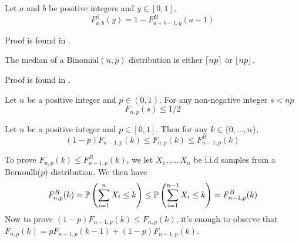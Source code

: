 \begin{lemma} \label{fact:equation_for_beta_binomial_cdfs}
	Let $a$ and $b$ be positive integers and $y \in [0,1]$, 
	\[
	F^\beta_{a,b}(y) = 1 - F^B_{a+b-1,y}(a-1)
	\]
\end{lemma}
\begin{myproof}[Proof.]
	Proof is found in \cite{agrawalanalysis}.
\end{myproof}
\begin{lemma} \label{fact:median_of_binomial_dist}
	The median of a Binomial$(n,p)$ distribution is either $\ceil{np}$ or $\floor{np}$.
\end{lemma}
\begin{myproof}[Proof]
	Proof is found in \cite{jogdeo1968monotone}.
\end{myproof}

\begin{corollary} \label{cor:corollarly_of_binomial_median_property}
	Let $n$ be a positive integer and $p \in (0,1)$. For any non-negative integer $s < np$
	\[
	F_{n,p}(s) \le 1/2
	\]
\end{corollary}

\begin{lemma} \label{fact:relationship_with_binom_cdfs}
	Let $n$ be a positive integer and $p \in [0,1]$. Then for any $k \in \{0,\ldots,n\}$,
	\[
	(1-p)F_{n-1,p}(k)\le F_{n,p}(k) \le F^B_{n-1,p}(k)
	\] 
\end{lemma}
\begin{myproof}[Proof]
	To prove $F_{n,p}(k) \le F^B_{n-1,p}(k)$, we let $X_1,\ldots,X_{n}$ be i.i.d samples from a Bernoulli($p$) distribution. We then have
	\begin{align*}
	F^B_{n,p}(k)  = \P{\sum_{i=1}^{n} X_i \le k}  \le  \P{\sum_{i=1}^{n-1} X_i \le k}  = F^B_{n-1,p}(k)
	\end{align*}
	Now to prove $(1-p)F_{n-1,p}(k)\le F_{n,p}(k)$, it's enough to observe that $F_{n,p}(k) = p F_{n-1,p}(k-1) + (1-p) F_{n-1,p}(k)$.
\end{myproof}

